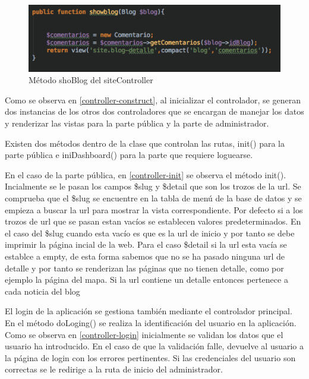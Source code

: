 \begin{figure}
\begin{center}
\includegraphics[width=1.0\textwidth]{imagenes/site-showblog.png}
\caption{Método shoBlog del siteController}
\label{site-showblog}
\end{center}
\end{figure}

Como se observa en \ref{controller-construct}, al inicializar el controlador, se generan dos instancias de los otros dos controladores que se encargan de manejar los datos y renderizar las vistas para la parte pública y la parte de administrador.

\vspace{5 mm}

Existen dos métodos dentro de la clase que controlan las rutas, init() para la parte pública e iniDashboard() para la parte que requiere loguearse. 

\vspace{5 mm}

En el caso de la parte pública, en \ref{controller-init} se observa el método init(). Incialmente se le pasan los campos \$slug y \$detail que son los trozos de la url. Se comprueba que el \$slug se encuentre en la tabla de menú de la base de datos y se empieza a buscar la url para mostrar la vista correspondiente. Por defecto si a los trozos de url que se pasan estan vacíos se establecen valores predeterminados. En el caso del \$slug cuando esta vacío es que es la url de inicio y por tanto se debe imprimir la página incial de la web. Para el caso \$detail si la url esta vacía se establce a empty, de esta forma sabemos que no se ha pasado ninguna url de detalle y por tanto se renderizan las páginas que no tienen detalle, como por ejemplo la página del mapa. Si la url contiene un detalle entonces pertenece a cada noticia del blog

\vspace{5 mm}

El login de la aplicación se gestiona también mediante el controlador principal. En el método doLoging() se realiza la identificación del usuario en la aplicación. Como se observa en \ref{controller-login} inicialmente se validan los datos que el usuario ha introducido. En el caso de que la validación falle, devuelve al usuario a la página de login con los errores pertinentes. Si las credenciales del usuario son correctas se le redirige a la ruta de inicio del administrador.

